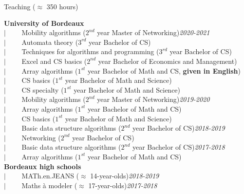 \documentclass[french]{resume} %
\begin{document}
	\begin{rSection}{Teaching ($\approx$ 350 hours)}
		
		
		\textbf{University of Bordeaux} \\
		$| \qquad$ Mobility algorithms ($2^{nd}$ year Master of Networking)\hfill {\em 2020-2021}\\
		$| \qquad$ Automata theory ($3^{rd}$ year Bachelor of CS)\\
		$| \qquad$ Techniques for algorithms and programming ($3^{rd}$ year Bachelor of CS)\\
		$| \qquad$ Excel and CS basics ($2^{nd}$ year Bachelor of Economics and Management)\\
		$| \qquad$ Array algorithms ($1^{st}$ year Bachelor of Math and CS, \textbf{given in English})\\
		$| \qquad$ CS basics ($1^{st}$ year Bachelor of Math and Science)\\
		$| \qquad$ CS specialty ($1^{st}$ year Bachelor of Math and Science)\\
		$| \qquad$ Mobility algorithms ($2^{nd}$ year Master of Networking)\hfill {\em 2019-2020}\\
		$| \qquad$ Array algorithms ($1^{st}$ year Bachelor of Math and CS)\\
		$| \qquad$ CS basics ($1^{st}$ year Bachelor of Math and Science)\\
		$| \qquad$ Basic data structure algorithms ($2^{nd}$ year Bachelor of CS)\hfill {\em 2018-2019}\\
		$| \qquad$ Networking ($2^{nd}$ year Bachelor of CS)\\
		$| \qquad$ Basic data structure algorithms ($2^{nd}$ year Bachelor of CS)\hfill {\em 2017-2018}\\
		$| \qquad$ Array algorithms ($1^{st}$ year Bachelor of Math and CS)
		\\
		
		\textbf{Bordeaux high schools} \\
		$| \qquad$ MATh.en.JEANS ($\approx$ 14-year-olds)\hfill {\em 2018-2019}\\
		$| \qquad$ Maths à modeler ($\approx$ 17-year-olds)\hfill {\em 2017-2018}
	\end{rSection}
	
\end{document}
